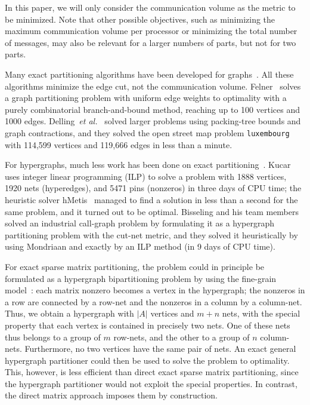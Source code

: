 In this paper, we will only consider the communication volume
as the metric to be minimized. 
Note that other possible objectives, such as 
minimizing the maximum communication volume per processor
or minimizing the total number of messages, 
may also be relevant for a larger numbers of parts,
but not for two parts.

Many exact partitioning algorithms have been developed for graphs~\cite{karisch00,sensen01,felner05,hager13,delling14}. All these algorithms minimize the edge cut,
not the communication volume.
Felner~\cite{felner05} solves a graph partitioning problem
with uniform edge weights to optimality
with a purely combinatorial branch-and-bound method,
reaching up to 100 vertices and 1000 edges.
Delling~\textit{et al.\ }\cite{delling14} solved larger problems
using packing-tree bounds and graph contractions, and they solved 
the open street map problem \texttt{luxembourg} with
114,599 vertices and 119,666 edges in less than a minute.

For hypergraphs, much less work has been
done on exact partitioning~\cite{caldwell00,kucar04,bisseling05}.
Kucar~\cite{kucar04} uses integer linear programming (ILP) 
to solve a problem with 1888 vertices, 1920 nets (hyperedges), and 5471
pins (nonzeros) in three days of CPU time; the heuristic solver
hMetis~\cite{karypis99b}
managed to find a solution in less than a second for the same problem,
and it turned out to be optimal.
Bisseling and his team members~\cite{bisseling05}
solved an industrial call-graph problem
by formulating it as a hypergraph partitioning problem with the cut-net metric,
and they solved it heuristically by using Mondriaan
and exactly by an ILP method (in 9 days of CPU time).

For exact sparse matrix partitioning,
the problem could in principle be formulated
as a hypergraph bipartitioning problem by using
the fine-grain model~\cite{catalyurek01}:
each matrix nonzero becomes a vertex in the hypergraph;
the nonzeros in a row are connected by a row-net  
and the nonzeros in a column by a column-net.
Thus, we obtain a hypergraph with $|A|$ vertices and $m+n$ nets,
with the special property that each vertex is
contained in precisely two nets.
One of these nets thus belongs to a group of $m$ row-nets, and the other to
a group of $n$ column-nets. Furthermore, no two vertices have the same pair
of nets.
An exact general hypergraph partitioner could then be used to solve
the problem to optimality. 
This, however, is less efficient than direct exact sparse matrix partitioning,
since the hypergraph partitioner would not exploit the special properties.
In contrast, the direct matrix approach imposes them
by construction.

